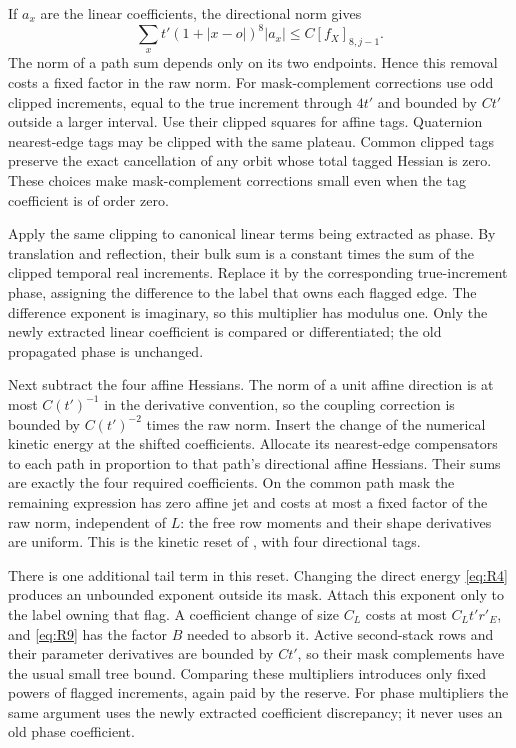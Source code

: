 If $a_x$ are the linear coefficients, the directional norm gives
\begin{equation}
              \sum_x t'(1+|x-o|)^8|a_x|
                            \le C[f_X]_{8,j-1}.
 \label{eq:rg-linear-removal}
\end{equation}
The norm of a path sum depends only on its two endpoints.  Hence this
removal costs a fixed factor in the raw norm.  For mask-complement
corrections use odd clipped increments, equal to the true increment
through $4t'$ and bounded by $Ct'$ outside a larger interval.  Use their
clipped squares for affine tags.  Quaternion nearest-edge tags may be
clipped with the same plateau.  Common clipped tags preserve the exact
cancellation of any orbit whose total tagged Hessian is zero.  These
choices make mask-complement corrections small even when the tag
coefficient is of order zero.

Apply the same clipping to canonical linear terms being extracted as
phase.  By translation and reflection, their bulk sum is a constant
times the sum of the clipped temporal real increments.  Replace it by
the corresponding true-increment phase, assigning the difference to the
label that owns each flagged edge.  The difference exponent is
imaginary, so this multiplier has modulus one.  Only the newly extracted
linear coefficient is compared or differentiated; the old propagated
phase is unchanged.

Next subtract the four affine Hessians.  The norm of a unit affine
direction is at most $C(t')^{-1}$ in the derivative convention, so the
coupling correction is bounded by $C(t')^{-2}$ times the raw norm.
Insert the change of the numerical kinetic energy at the shifted
coefficients.  Allocate its nearest-edge compensators to each path in
proportion to that path's directional affine Hessians.  Their sums are
exactly the four required coefficients.  On the common path mask the
remaining expression has zero affine jet and costs at most a fixed
factor of the raw norm, independent of $L$: the free row moments and
their shape derivatives are uniform.  This is the kinetic reset of
\cite[Section ``Normalization, periods, and closure'', kinetic-reset
identity]{SharpO4}, with four directional tags.

There is one additional tail term in this reset.  Changing the direct
energy \eqref{eq:R4} produces an unbounded exponent outside its mask.
Attach this exponent only to the label owning that flag.  A coefficient
change of size $C_L$ costs at most $C_Lt'r'_E$, and
\eqref{eq:R9} has the factor $B$ needed to absorb it.  Active
second-stack rows and their parameter derivatives are bounded by $Ct'$,
so their mask complements have the usual small tree bound.  Comparing
these multipliers introduces only fixed powers of flagged increments,
again paid by the reserve.  For phase multipliers the same argument
uses the newly extracted coefficient discrepancy; it never uses an
old phase coefficient.

